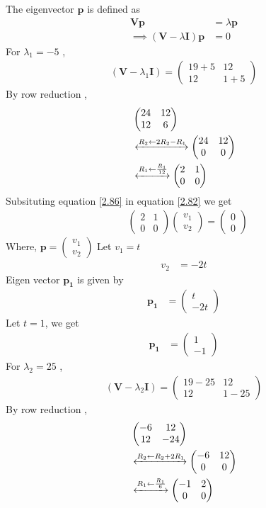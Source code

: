 \documentclass[journal,12pt,twocolumn]{IEEEtran}
\let\vec\mathbf
\numberwithin{equation}{subsection}
\newcommand{\myvec}[1]{\ensuremath{\begin{pmatrix}#1\end{pmatrix}}}
\begin{document}
The eigenvector $\vec{p}$ is defined as 
\begin{align}
    \vec{V}\vec{p}&=\lambda\vec{p}\\
    \implies (\vec{V}-\lambda\vec{I})\vec{p}&=0\label{2.82}
\end{align}
For $\lambda_1=-5$ ,
\begin{align}
    (\vec{V}-\lambda_1\vec{I})=\myvec{19+5 & 12 \\12 & 1+5}
\end{align}
By row reduction , 
\begin{align}
    &\myvec{24 & 12 \\12 & 6}\\
&\xleftrightarrow{R_2\leftarrow 2R_2 -R_1}
    \myvec{24 & 12 \\ 0& 0}\\
        &\xleftrightarrow{R_1\leftarrow \frac{R_1}{12}}
    \myvec{2 & 1 \\ 0& 0}
    \label{2.86}
\end{align}
Subsituting equation \ref{2.86} in equation \ref{2.82} we get
\begin{align}
        &   \myvec{2 & 1 \\ 0& 0}\myvec{v_1 \\ v_2}=\myvec{0 \\ 0}\label{2.87}
\end{align}
Where, $\vec{p}=\myvec{v_1\\v_2}$
Let $v_1=t$
\begin{align}
    v_2&=-2t
\end{align}
Eigen vector $\vec{p_1}$ is given by
\begin{align}
    \vec{p_1}&=\myvec{t \\ -2t}
\end{align}
Let $t=1$, we get
\begin{align}
        \vec{p_1}&=\myvec{1 \\-1 }\label{2.90}
\end{align}
For $\lambda_2=25$ ,
\begin{align}
    (\vec{V}-\lambda_2\vec{I})=\myvec{19-25 & 12 \\12 & 1-25}
\end{align}
By row reduction , 
\begin{align}
    &\myvec{-6 & 12 \\12 & -24}\\
&\xleftrightarrow{R_2\leftarrow R_2 +2R_1}
    \myvec{-6 & 12 \\ 0& 0}\\
        &\xleftrightarrow{R_1\leftarrow \frac{R_1}{6}}
    \myvec{-1 & 2 \\ 0& 0}
    \label{2.94}
\end{align}
\end{document}
